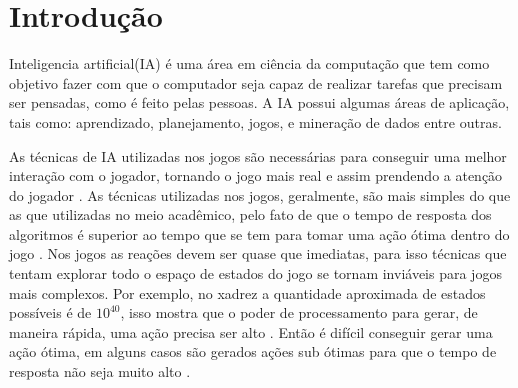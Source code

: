 \chapter{\label{chap:intro}Introdução}

Inteligencia artificial(IA) é uma área em ciência da computação que tem como objetivo fazer com que o computador seja capaz de realizar tarefas que precisam ser pensadas, como é feito pelas pessoas.  
A IA possui algumas áreas de aplicação, tais como: aprendizado, planejamento, jogos, e mineração de dados entre outras. 

As técnicas de IA utilizadas nos jogos são necessárias para conseguir uma melhor interação com o jogador, tornando o jogo mais real e assim prendendo a atenção do jogador \cite{millington2009artificial}. 
As técnicas utilizadas nos jogos, geralmente, são mais simples do que as que utilizadas no meio acadêmico, pelo fato de que o tempo de resposta dos algoritmos é superior ao tempo que se tem para tomar uma ação ótima dentro do jogo \cite{intelligence2003modern}. 
Nos jogos as reações devem ser quase que imediatas, para isso técnicas que tentam explorar todo o espaço de estados do jogo se tornam inviáveis para jogos mais complexos.
Por exemplo, no xadrez a quantidade aproximada de estados possíveis é de $10^{40}$, isso mostra que o poder de processamento para gerar, de maneira rápida, uma ação precisa ser alto \cite{millington2009artificial}. Então é difícil conseguir gerar uma ação ótima, em alguns casos são gerados ações sub ótimas para que o tempo de resposta não seja muito alto \cite{intelligence2003modern}.     %


